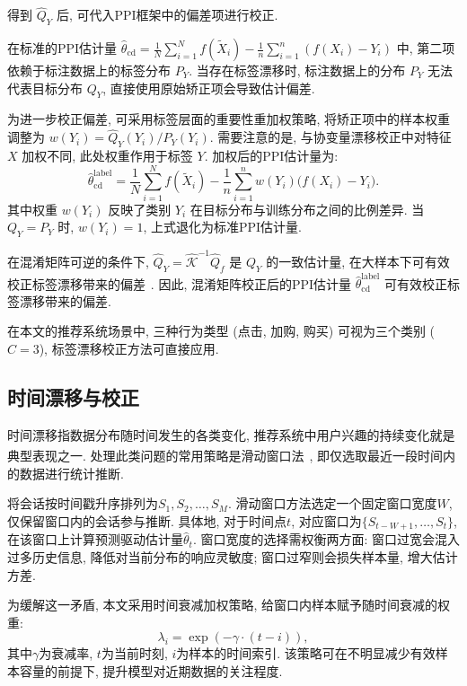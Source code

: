 \documentclass[a4paper, AutoFakeBold, UTF8]{ctexrep}
\theoremstyle{plain}
\newcommand{\upcite}[1]
{\textsuperscript{~\cite{#1}}}
\numberwithin{equation}{chapter}
\begin{document}
得到 $\hat{Q}_Y$ 后, 可代入PPI框架中的偏差项进行校正. 

在标准的PPI估计量 $\hat{\theta}_{\text{cd}} = \frac{1}{N}\sum_{i=1}^{N} f (\tilde{X}_i)  - \frac{1}{n}\sum_{i=1}^{n} (f (X_i) -Y_i) $ 中, 第二项依赖于标注数据上的标签分布 $P_Y$. 当存在标签漂移时, 标注数据上的分布 $P_Y$ 无法代表目标分布 $Q_Y$, 直接使用原始矫正项会导致估计偏差. 

为进一步校正偏差, 可采用标签层面的重要性重加权策略, 将矫正项中的样本权重调整为 $w (Y_i)  = \hat{Q}_Y (Y_i)  / P_Y (Y_i) $. 需要注意的是, 与协变量漂移校正中对特征 $X$ 加权不同, 此处权重作用于标签 $Y$. 加权后的PPI估计量为: 
\begin{equation}
\hat{\theta}_{\text{cd}}^{\text{label}} = \frac{1}{N}\sum_{i=1}^{N} f (\tilde{X}_i)  - \frac{1}{n}\sum_{i=1}^{n} w (Y_i)  \bigl (f (X_i) -Y_i\bigr). \label{eq: theta_label}
\end{equation}
其中权重 $w (Y_i) $ 反映了类别 $Y_i$ 在目标分布与训练分布之间的比例差异. 当 $Q_Y = P_Y$ 时, $w (Y_i) =1$, 上式退化为标准PPI估计量. 

在混淆矩阵可逆的条件下, $\hat{Q}_Y = \hat{\mathcal{K}}^{-1} \hat{Q}_f$ 是 $Q_Y$ 的一致估计量, 在大样本下可有效校正标签漂移带来的偏差\upcite{Lipton2018}. 因此, 混淆矩阵校正后的PPI估计量 $\hat{\theta}_{\text{cd}}^{\text{label}}$ 可有效校正标签漂移带来的偏差. 

在本文的推荐系统场景中, 三种行为类型 (点击, 加购, 购买) 可视为三个类别 ($C=3$), 标签漂移校正方法可直接应用. 

\subsection{时间漂移与校正}

时间漂移指数据分布随时间发生的各类变化, 推荐系统中用户兴趣的持续变化就是典型表现之一. 处理此类问题的常用策略是滑动窗口法\upcite{Gama2014}, 即仅选取最近一段时间内的数据进行统计推断. 

将会话按时间戳升序排列为$S_1, S_2, \ldots, S_M$. 滑动窗口方法选定一个固定窗口宽度$W$, 仅保留窗口内的会话参与推断. 具体地, 对于时间点$t$, 对应窗口为$\{S_{t-W+1}, \ldots, S_t\}$, 在该窗口上计算预测驱动估计量$\hat{\theta}_t$. 窗口宽度的选择需权衡两方面: 窗口过宽会混入过多历史信息, 降低对当前分布的响应灵敏度; 窗口过窄则会损失样本量, 增大估计方差. 

为缓解这一矛盾, 本文采用时间衰减加权策略, 给窗口内样本赋予随时间衰减的权重: 
\begin{equation}
\lambda_i = \exp (-\gamma \cdot  (t - i) ), \label{eq: lambda}
\end{equation}
其中$\gamma$为衰减率, $t$为当前时刻, $i$为样本的时间索引. 该策略可在不明显减少有效样本容量的前提下, 提升模型对近期数据的关注程度. 
\end{document}
